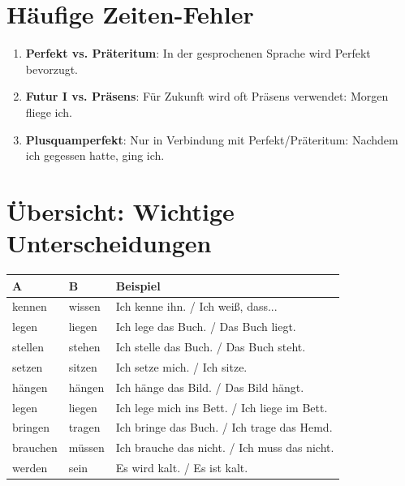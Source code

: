 \section{Häufige Zeiten-Fehler}
\label{sec:ZeitenFehler}

\begin{enumerate}
    \item \textbf{Perfekt vs. Präteritum}: In der gesprochenen Sprache wird Perfekt bevorzugt.
    \item \textbf{Futur I vs. Präsens}: Für Zukunft wird oft Präsens verwendet: Morgen fliege ich.
    \item \textbf{Plusquamperfekt}: Nur in Verbindung mit Perfekt/Präteritum: Nachdem ich gegessen hatte, ging ich.
\end{enumerate}

\section{Übersicht: Wichtige Unterscheidungen}
\label{sec:Unterscheidungen}

\begin{center}
\begin{tabular}{|l|l|l|}
\hline
\textbf{A} & \textbf{B} & \textbf{Beispiel} \\ \hline
kennen & wissen & Ich kenne ihn. / Ich weiß, dass... \\ \hline
legen & liegen & Ich lege das Buch. / Das Buch liegt. \\ \hline
stellen & stehen & Ich stelle das Buch. / Das Buch steht. \\ \hline
setzen & sitzen & Ich setze mich. / Ich sitze. \\ \hline
hängen & hängen & Ich hänge das Bild. / Das Bild hängt. \\ \hline
legen & liegen & Ich lege mich ins Bett. / Ich liege im Bett. \\ \hline
bringen & tragen & Ich bringe das Buch. / Ich trage das Hemd. \\ \hline
brauchen & müssen & Ich brauche das nicht. / Ich muss das nicht. \\ \hline
werden & sein & Es wird kalt. / Es ist kalt. \\ \hline
\end{tabular}
\end{center}

\chapterend